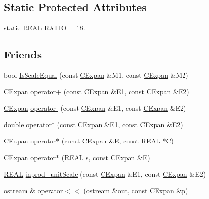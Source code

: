 \subsection*{Static Protected Attributes}
\begin{DoxyCompactItemize}
\item 
static \hyperlink{util_8h_a5821460e95a0800cf9f24c38915cbbde}{R\-E\-A\-L} \hyperlink{classCExpan_a1e3c0894a6550c4b01722e9741c83666}{R\-A\-T\-I\-O} = 18.
\end{DoxyCompactItemize}
\subsection*{Friends}
\begin{DoxyCompactItemize}
\item 
bool \hyperlink{classCExpan_a35fefc436ee691468cdc7390ec783400}{Is\-Scale\-Equal} (const \hyperlink{classCExpan}{C\-Expan} \&M1, const \hyperlink{classCExpan}{C\-Expan} \&M2)
\item 
\hyperlink{classCExpan}{C\-Expan} \hyperlink{classCExpan_af86f70797548daca1b4c94f306eb22c3}{operator+} (const \hyperlink{classCExpan}{C\-Expan} \&E1, const \hyperlink{classCExpan}{C\-Expan} \&E2)
\item 
\hyperlink{classCExpan}{C\-Expan} \hyperlink{classCExpan_a61b8986661aaa2d6f0eff5e5f2c58488}{operator-\/} (const \hyperlink{classCExpan}{C\-Expan} \&E1, const \hyperlink{classCExpan}{C\-Expan} \&E2)
\item 
double \hyperlink{classCExpan_a0dfbb05f2e29baa6aa8c097598bf9d45}{operator$\ast$} (const \hyperlink{classCExpan}{C\-Expan} \&E1, const \hyperlink{classCExpan}{C\-Expan} \&E2)
\item 
\hyperlink{classCExpan}{C\-Expan} \hyperlink{classCExpan_a70abf8064fc2c038c82602327d23da1a}{operator$\ast$} (const \hyperlink{classCExpan}{C\-Expan} \&E, const \hyperlink{util_8h_a5821460e95a0800cf9f24c38915cbbde}{R\-E\-A\-L} $\ast$C)
\item 
\hyperlink{classCExpan}{C\-Expan} \hyperlink{classCExpan_ac0b2a0b0ce2280f60412bb96aed5f3dd}{operator$\ast$} (\hyperlink{util_8h_a5821460e95a0800cf9f24c38915cbbde}{R\-E\-A\-L} s, const \hyperlink{classCExpan}{C\-Expan} \&E)
\item 
\hyperlink{util_8h_a5821460e95a0800cf9f24c38915cbbde}{R\-E\-A\-L} \hyperlink{classCExpan_a5b8852acff77a8c6c5a167d050c7cee2}{inprod\-\_\-unit\-Scale} (const \hyperlink{classCExpan}{C\-Expan} \&E1, const \hyperlink{classCExpan}{C\-Expan} \&E2)
\item 
ostream \& \hyperlink{classCExpan_adfca34b8a78f7e0647ee4113707047c4}{operator$<$$<$} (ostream \&out, const \hyperlink{classCExpan}{C\-Expan} \&p)
\end{DoxyCompactItemize}


